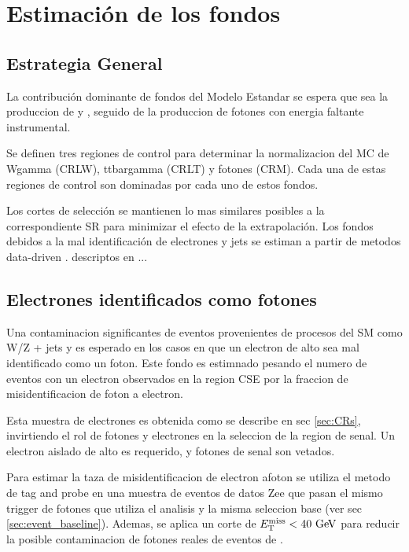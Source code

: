 \chapter{Estimaci\'on de los fondos} \label{cap:fondos}


\section{Estrategia General}

La contribuci\'on dominante de fondos del Modelo Estandar se espera que sea la produccion de
{\wgam} y {\ttgam}, seguido de la produccion de fotones con energia faltante instrumental.

Se definen tres regiones de control para determinar la normalizacion del MC de Wgamma (CRLW),
ttbargamma (CRLT) y fotones (CRM). Cada una de estas regiones de control son dominadas por cada uno
de estos fondos.

Los cortes de selecci\'on se mantienen lo mas similares posibles a la correspondiente SR para
minimizar el efecto de la extrapolaci\'on. Los fondos debidos a la mal identificaci\'on de
electrones y jets se estiman a partir de metodos data-driven .
descriptos en ...

\section{Electrones identificados como fotones} \label{sec:efakes}

Una contaminacion significantes de eventos provenientes de procesos del SM
como W/Z + jets y {\tt} es esperado en los casos en que un electron de alto
{\pt} sea mal identificado como un foton. Este fondo es estimnado pesando
el numero de eventos con un electron observados en la region CSE por la
fraccion de misidentificacion de foton a electron.

Esta muestra de electrones es obtenida como se describe en sec \ref{sec:CRs},
invirtiendo el rol de fotones y electrones en la seleccion de la region de senal.
Un electron aislado de alto {\pt}  es requerido, y fotones de senal son vetados.

Para estimar la taza de misidentificacion de electron afoton se utiliza el metodo
de tag and probe en una muestra de eventos de datos Zee que pasan el mismo trigger
de fotones que utiliza el analisis y la misma seleccion base (ver sec \ref{sec:event_baseline}).
Ademas, se aplica un corte de $\met  < 40 \gev$ para reducir la posible contaminacion de fotones
reales de eventos de {\wgam}.

